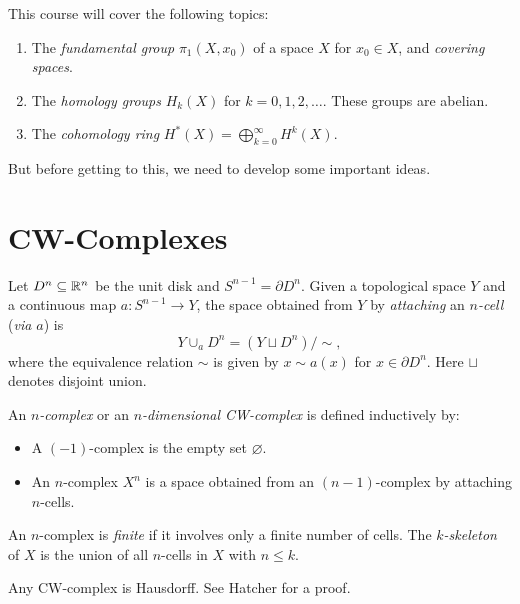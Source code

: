 This course will cover the following topics:
\begin{enumerate}
  \item The \emph{fundamental group}
    $\pi_1(X, x_0)$ of a space $X$ for $x_0 \in X$,
    and \emph{covering spaces}.
  \item The \emph{homology groups} $H_k(X)$ for
    $k = 0, 1, 2, \dots$. These groups are abelian.
  \item The \emph{cohomology ring}
    $H^*(X) = \bigoplus_{k = 0}^\infty H^k(X)$.
\end{enumerate}
But before getting to this, we need to develop some
important ideas.

\section{CW-Complexes}

\begin{definition}
  Let $D^n \subseteq \mathbb{R}^n$ be the unit disk and
  $S^{n - 1} = \partial D^n$. Given a topological
  space $Y$ and a continuous map $a : S^{n - 1} \to Y$,
  the space obtained from $Y$ by \emph{attaching} an
  \emph{$n$-cell} (\emph{via $a$}) is
  \[
    Y \cup_a D^n = (Y \sqcup D^n) / {\sim},
  \]
  where the equivalence relation $\sim$ is given by
  $x \sim a(x)$ for $x \in \partial D^n$.
  Here $\sqcup$ denotes disjoint union.
\end{definition}

\begin{definition}
  An \emph{$n$-complex} or an \emph{$n$-dimensional CW-complex}
  is defined inductively by:
  \begin{itemize}
    \item A $(-1)$-complex is the empty set $\varnothing$.
    \item An $n$-complex $X^n$ is a space obtained
      from an $(n - 1)$-complex by attaching $n$-cells.
  \end{itemize}
  An $n$-complex is \emph{finite} if it involves
  only a finite number of cells. The \emph{$k$-skeleton}
  of $X$ is the union of all $n$-cells in $X$
  with $n \le k$.
\end{definition}

\begin{remark}
  Any CW-complex is Hausdorff. See Hatcher for a proof.
\end{remark}

